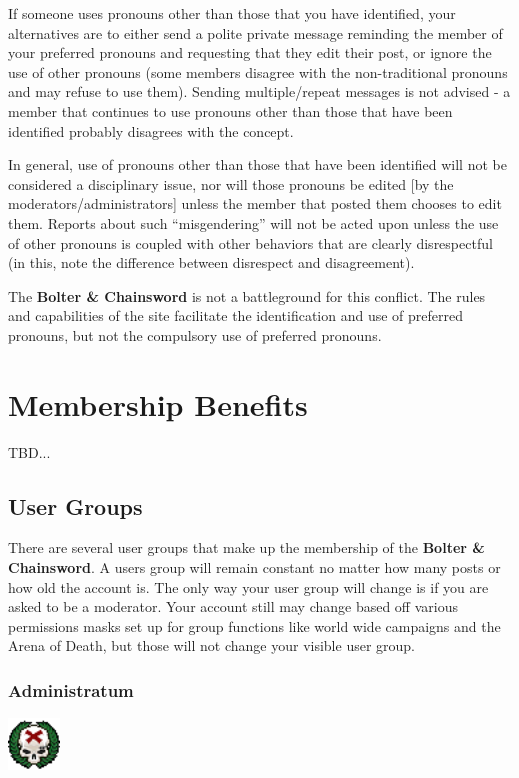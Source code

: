 \documentclass[12pt]{article}
\newcommand{\bnc}{{\textbf{Bolter \& Chainsword}}}%
\begin{document}
If someone uses pronouns other than those that you have identified, 
your alternatives are to either send a polite private message reminding 
the member of your preferred pronouns and requesting that they edit 
their post, or ignore the use of other pronouns (some members disagree 
with the non-traditional pronouns and may refuse to use them). Sending 
multiple/repeat messages is not advised - a member that continues to 
use pronouns other than those that have been identified probably 
disagrees with the concept.

In general, use of pronouns other than those that have been identified 
will not be considered a disciplinary issue, nor will those pronouns be 
edited [by the moderators/administrators] unless the member that posted 
them chooses to edit them. Reports about such ``misgendering'' will not 
be acted upon unless the use of other pronouns is coupled with other 
behaviors that are clearly disrespectful (in this, note the difference 
between disrespect and disagreement).

The {\bnc} is not a battleground for this conflict. The 
rules and capabilities of the site facilitate the identification and 
use of preferred pronouns, but not the compulsory use of preferred 
pronouns.

\section{Membership Benefits}

TBD...

\subsection{User Groups}

There are several user groups that make up the membership of the
{\bnc}. A users group will remain constant no matter how many 
posts or how old the account is. The only way your user group will 
change is if you are asked to be a moderator. Your account still may 
change based off various permissions masks set up for group functions 
like world wide campaigns and the Arena of Death, but those will not 
change your visible user group.
 

\subsubsection{Administratum}
\includegraphics[width=39pt, height=39pt]{Admin.png}
\end{document}
